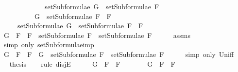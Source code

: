 \begin{isabellebody}
\ \ \ \ \ \ \ \ \ \ \ \ {\isasymLongrightarrow}\ setSubformulae\ G\ {\isasymsubseteq}\ setSubformulae\ F{}{\isachardoublequoteclose}\isanewline
\ \ \ \ \ \ \ \ \ \ {\isachardoublequoteopen}G\ {\isasymin}\ setSubformulae\ {\isacharparenleft}F{}\ \isactrlbold {\isasymrightarrow}\ F{}{\isacharparenright}{\isachardoublequoteclose}\isanewline
\ \ \ \ \ {\isachardoublequoteopen}setSubformulae\ G\ {\isasymsubseteq}\ setSubformulae\ {\isacharparenleft}F{}\ \isactrlbold {\isasymrightarrow}\ F{}{\isacharparenright}{\isachardoublequoteclose}\isanewline
%
\isadelimproof
%
\endisadelimproof
%
\isatagproof
{}\isamarkupfalse%
\ {\isacharminus}\isanewline
\ \ \isamarkupfalse%
\ {\isachardoublequoteopen}G\ {\isasymin}\ {\isacharbraceleft}F{}\ \isactrlbold {\isasymrightarrow}\ F{}{\isacharbraceright}\ {\isasymunion}\ {\isacharparenleft}setSubformulae\ F{}\ {\isasymunion}\ setSubformulae\ F{}{\isacharparenright}{\isachardoublequoteclose}\isanewline
\ \ \ \ \isamarkupfalse%
\ assms{\isacharparenleft}{}{\isacharparenright}\ \isanewline
\ \ \ \ \isamarkupfalse%
\ {\isacharparenleft}simp\ only{\isacharcolon}\ setSubformulae{\isacharunderscore}imp{\isacharparenright}\isanewline
\ \ \isamarkupfalse%
\ \isamarkupfalse%
\ {\isachardoublequoteopen}G\ {\isasymin}\ {\isacharbraceleft}F{}\ \isactrlbold {\isasymrightarrow}\ F{}{\isacharbraceright}\ {\isasymor}\ G\ {\isasymin}\ setSubformulae\ F{}\ {\isasymunion}\ setSubformulae\ F{}{\isachardoublequoteclose}\isanewline
\ \ \ \ \isamarkupfalse%
\ {\isacharparenleft}simp\ only{\isacharcolon}\ Un{\isacharunderscore}iff{\isacharparenright}\isanewline
\ \ \isamarkupfalse%
\ \isamarkupfalse%
\ {\isacharquery}thesis\isanewline
\ \ \isamarkupfalse%
\ {\isacharparenleft}rule\ disjE{\isacharparenright}\isanewline
\ \ \ \ \isamarkupfalse%
\ {\isachardoublequoteopen}G\ {\isasymin}\ {\isacharbraceleft}F{}\ \isactrlbold {\isasymrightarrow}\ F{}{\isacharbraceright}{\isachardoublequoteclose}\isanewline
\ \ \ \ \isamarkupfalse%
\ \isamarkupfalse%
\ {\isachardoublequoteopen}G\ {\isacharequal}\ F{}\ \isactrlbold {\isasymrightarrow}\ F{}{\isachardoublequoteclose}\isanewline
\ \ \ \ \ \ \isamarkupfalse%

\end{isabellebody}
